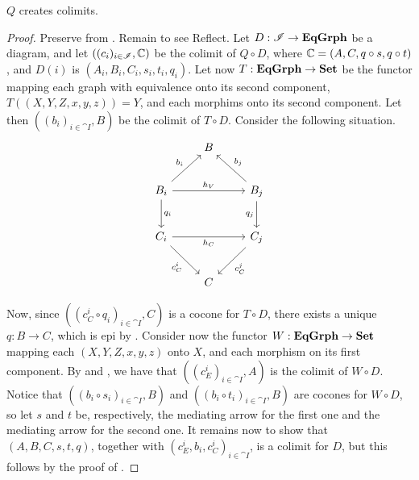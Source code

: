 {\color{red}
\begin{prop}\label{prop:quot_creat_colims}
    $Q$ creates colimits.
\end{prop}


\begin{proof}
    Preserve from . Remain to see Reflect.
	Let $D: \mathscr{I} \to \mathbf{EqGrph}$ be a diagram, and let $((c_i)_{i\in \mathscr{I}}, \mathbb{C})$ be the colimit of $Q \circ D$, where $\mathbb{C} = (A, C, q\circ s, q\circ t)$, and $D(i)$ is $(A_i, B_i, C_i, s_i, t_i, q_i)$.
	Let now $T: \mathbf{EqGrph} \to \mathbf{Set}$ be the functor mapping each graph with equivalence onto its second component, $T((X, Y, Z, x, y, z)) = Y$, and each morphims onto its second component.
	Let then $((b_i)_{i\in \cat I}, B)$ be the colimit of $T \circ D$.
	Consider the following situation.
	\[\begin{tikzcd}[row sep = 24, column sep = 24]
		& B & \\
		B_i \ar[ur, "{b_i}"] \ar[rr, "h_V"] \ar[d, "{q_i}"] & & B_j \ar[ul, "{b_j}"swap] \ar[d, "{q_j}" swap] \\
		C_i \ar[dr, "{c_C^i}" swap] \ar[rr, "{h_C}"swap] & & C_j \ar[dl, "{c_C^j}"] \\
		& C &
	\end{tikzcd}\]

	Now, since $((c^i_C \circ q_i)_{i \in \cat I}, C)$ is a cocone for $T \circ D$, there exists a unique $q: B \to C$, which is epi by .
	Consider now the functor $W: \mathbf{EqGrph} \to \mathbf{Set}$ mapping each $(X, Y, Z, x, y, z)$ onto $X$, and each morphism on its first component. By  and , we have that $((c_E^i)_{i \in \cat I}, A)$ is the colimit of $W \circ D$.
	Notice that $((b_i \circ s_i)_{i \in \cat{I}}, B)$ and $((b_i \circ t_i)_{i \in \cat I}, B)$ are cocones for $W \circ D$, so let $s$ and $t$ be, respectively, the mediating arrow for the first one and the mediating arrow for the second one. It remains now to show that $(A, B, C, s, t, q)$, together with $(c_E^i, b_i, c_C^i)_{i \in \cat I}$, is a colimit for $D$, but this follows by the proof of .
\end{proof}

}

